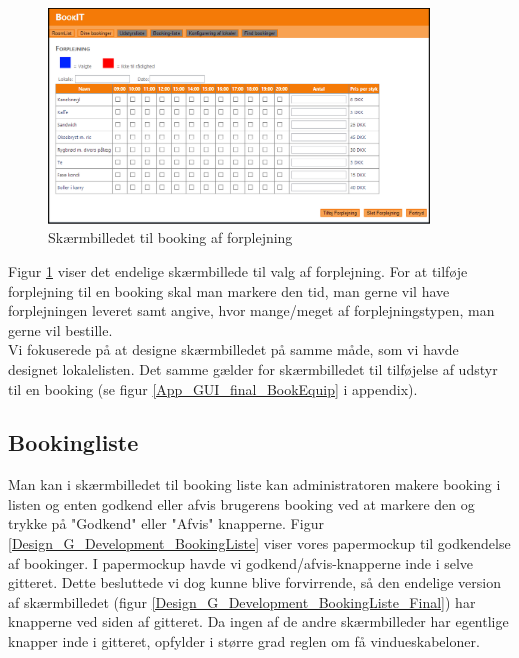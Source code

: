 \begin{figure}[h!]
  \centering
    \includegraphics[width=0.9\textwidth]{Appendix/GUI-Prototype/DigitalMockup/Forplejning}
  \caption{Skærmbilledet til booking af forplejning}
\label{Design_G_Development_Forplejning_Final}
\end{figure} 

Figur \ref{Design_G_Development_Forplejning_Final} viser det endelige skærmbillede til valg af forplejning. For at tilføje forplejning til en booking skal man markere den tid, man gerne vil have forplejningen leveret samt angive, hvor mange/meget af forplejningstypen, man gerne vil bestille.
\\Vi fokuserede på at designe skærmbilledet på samme måde, som vi havde designet lokalelisten. Det samme gælder for skærmbilledet til tilføjelse af udstyr til en booking (se figur \ref{App_GUI_final_BookEquip} i appendix).

\subsection{Bookingliste}
Man kan i skærmbilledet til booking liste kan administratoren makere booking i listen og enten godkend eller afvis brugerens booking ved at markere den og trykke på "Godkend" eller "Afvis" knapperne.
Figur \ref{Design_G_Development_BookingListe} viser vores papermockup til godkendelse af bookinger. 
I papermockup havde vi godkend/afvis-knapperne inde i selve gitteret. Dette besluttede vi dog kunne blive forvirrende, så den endelige version af skærmbilledet (figur \ref{Design_G_Development_BookingListe_Final}) har knapperne ved siden af gitteret. Da ingen af de andre skærmbilleder har egentlige knapper inde i gitteret, opfylder i større grad reglen om få vindueskabeloner.

